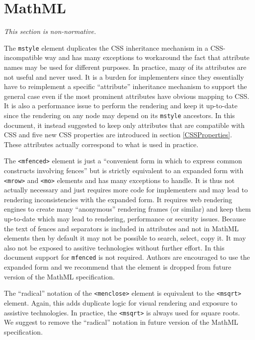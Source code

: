 \appendix

\section{MathML}

{\em This section is non-normative.}

The {\tt mstyle} element duplicates the CSS inheritance mechanism in a
CSS-incompatible way and has many exceptions to workaround the fact that
attribute names may be used for different purposes. In practice, many of its
attributes are not useful and never used. It is a burden for implementers since
they essentially have to reimplement a specific ``attribute'' inheritance
mechanism to support the general case even if the most prominent attributes
have obvious mapping to CSS. It is also a performance issue to perform the
rendering and keep it up-to-date since the rendering on any node may depend on
its {\tt mstyle} ancestors. In this document, it instead suggested to keep only
attributes that are compatible with CSS and five new CSS properties are
introduced in section \ref{CSSProperties}.
These attributes actually correspond to what is used in practice.

The {\tt <mfenced>} element is just a
``convenient form in which to express common constructs involving fences''
but is strictly equivalent to an expanded form with {\tt <mrow>} and
{\tt <mo>} elements and has many exceptions to handle.
It is thus not actually necessary and just requires more
code for implementers and may lead to rendering inconsistencies with the
expanded form. It requires web rendering engines to create many
``anonymous'' rendering frames (or similar) and keep them up-to-date which may
lead to rendering, performance or security issues. Because the text of fences
and separators is included in attributes and not in MathML elements then by
default it may not be possible to search, select, copy it. It may also not be
exposed to assitive technologies without further effort. In this document
support for {\tt mfenced} is not required.
Authors are encouraged to use the expanded form and we recommend that the
element is dropped from future version of the MathML specification.

The ``radical'' notation of the {\tt <menclose>} element is equivalent to the
{\tt <msqrt>} element. Again, this adds duplicate logic for visual rendering and
exposure to assistive technologies. In practice, the {\tt <msqrt>} is always
used for square roots. We suggest to remove the ``radical'' notation in
future version of the MathML specification.

